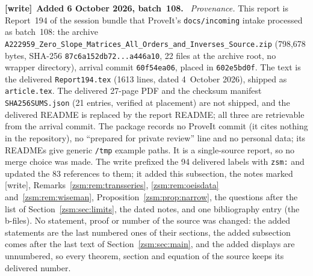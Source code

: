 \documentclass[11pt]{article}
\theoremstyle{definition}\newtheorem{definition}[theorem]{Definition}
\theoremstyle{remark}\newtheorem{remark}[theorem]{Remark}
\newcommand{\file}[1]{\nolinkurl{#1}}
\newenvironment{writenote}[1][]{\par\smallskip\begingroup\small
 \noindent\textbf{[write]}\if\relax\detokenize{#1}\relax\else~\textbf{#1.}\fi\ }%
 {\par\endgroup\smallskip}
\begin{document}
\begin{writenote}[Added 6 October 2026, batch~108]
\emph{Provenance.} This report is Report~194 of the session bundle that
ProveIt's \file{docs/incoming} intake processed as batch~108: the archive
\file{A222959_Zero_Slope_Matrices_All_Orders_and_Inverses_Source.zip}
(798{,}678 bytes, SHA-256 \file{87c6a152db72...a446a10}, 22 files at the
archive root, no wrapper directory), arrival commit \file{60f54ea06}, placed
in \file{602e5bd0f}. The text is the delivered \file{Report194.tex} (1613
lines, dated 4~October 2026), shipped as \file{article.tex}. The delivered
27-page PDF and the checksum manifest \file{SHA256SUMS.json} (21 entries,
verified at placement) are not shipped, and the delivered README is replaced
by the report README; all three are retrievable from the arrival commit. The
package records no ProveIt commit (it cites nothing in the repository), no
``prepared for private review'' line and no personal data; its READMEs give
generic \file{/tmp} example paths. It is a single-source report, so no merge
choice was made. The write prefixed the 94 delivered labels with
\file{zsm:} and updated the 83 references to them; it added this subsection,
the notes marked [write], Remarks~\ref{zsm:rem:transseries},
\ref{zsm:rem:oeisdata} and~\ref{zsm:rem:wiseman},
Proposition~\ref{zsm:prop:narrow}, the questions after the list of
Section~\ref{zsm:sec:limits}, the dated notes, and one bibliography entry
(the b-files). No statement,
proof or number of the source was changed: the added statements are the
last numbered ones of their sections, the added subsection comes after the
last text of Section~\ref{zsm:sec:main}, and the added displays are
unnumbered, so every theorem, section and equation of the source keeps its
delivered number.


\end{writenote}
\end{document}
